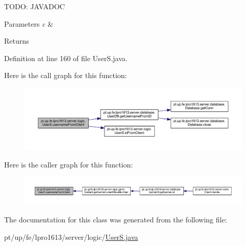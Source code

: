 T\+O\+DO\+: J\+A\+V\+A\+D\+OC 
\begin{DoxyParams}{Parameters}
{\em c} & \\
\hline
\end{DoxyParams}
\begin{DoxyReturn}{Returns}

\end{DoxyReturn}


Definition at line 160 of file User\+S.\+java.

Here is the call graph for this function\+:
\nopagebreak
\begin{figure}[H]
\begin{center}
\leavevmode
\includegraphics[width=350pt]{classpt_1_1up_1_1fe_1_1lpro1613_1_1server_1_1logic_1_1_user_s_a26c28666f4e6461ee06eecfe1f55356d_cgraph}
\end{center}
\end{figure}
Here is the caller graph for this function\+:
\nopagebreak
\begin{figure}[H]
\begin{center}
\leavevmode
\includegraphics[width=350pt]{classpt_1_1up_1_1fe_1_1lpro1613_1_1server_1_1logic_1_1_user_s_a26c28666f4e6461ee06eecfe1f55356d_icgraph}
\end{center}
\end{figure}


The documentation for this class was generated from the following file\+:\begin{DoxyCompactItemize}
\item 
pt/up/fe/lpro1613/server/logic/\hyperlink{_user_s_8java}{User\+S.\+java}\end{DoxyCompactItemize}
